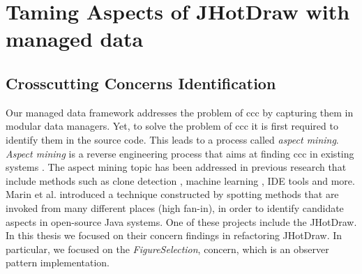 
\chapter{Taming Aspects of JHotDraw with managed data}\label{AspectRefactoring}

\section{Crosscutting Concerns Identification}
Our managed data framework addresses the problem of \ac{ccc} by capturing them in modular data managers.
Yet, to solve the problem of \ac{ccc} it is first required to identify them in the source code.
This leads to a process called \textit{aspect mining}.
\textit{Aspect mining} is a reverse engineering process that aims at finding \ac{ccc} in existing systems \cite{marin2004identifying}.
The aspect mining topic has been addressed in previous research that include methods such as clone detection \cite{bruntink2005use}, machine learning \cite{shepherd2004design}, IDE tools \cite{robillard2002concern} and more. 
Marin et al. \cite{marin2004identifying} introduced a technique constructed by spotting methods that are invoked from many different places (high fan-in), in order to identify candidate aspects in open-source Java systems.
One of these projects include the JHotDraw.
In this thesis we focused on their concern findings in refactoring JHotDraw.
In particular, we focused on the \textit{FigureSelection}, concern, which is an observer pattern implementation.

